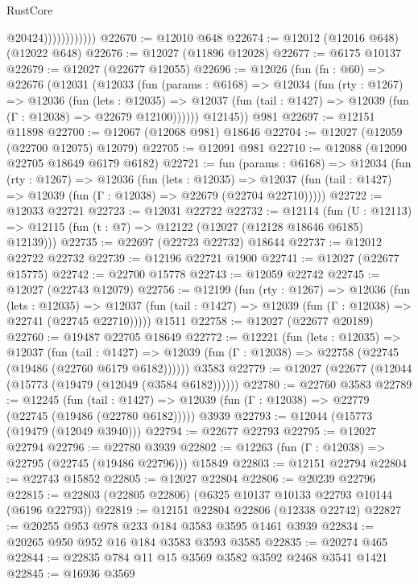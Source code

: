 \begin{lexlean}{RustCore}
\begin{coremodule}
                            @20424))))))))))))
@22670 := @12010 @648
@22674 := @12012 (@12016 @648) (@12022 @648)
@22676 := @12027 (@11896 @12028)
@22677 := @6175 @10137
@22679 := @12027 (@22677 @12055)
@22696 := @12026
    (fun (fn : @60) =>
    @22676
      (@12031
        (@12033
          (fun (params : @6168) =>
          @12034
            (fun (rty : @1267) =>
            @12036
              (fun (lets : @12035) =>
              @12037 (fun (tail : @1427) => @12039 (fun (Γ : @12038) => @22679 @12100))))))
        @12145))
    @981
@22697 := @12151 @11898
@22700 := @12067 (@12068 @981) @18646
@22704 := @12027 (@12059 (@22700 @12075) @12079)
@22705 := @12091 @981
@22710 := @12088 (@12090 @22705 @18649 @6179 @6182)
@22721 := fun (params : @6168) =>
  @12034
    (fun (rty : @1267) =>
    @12036
      (fun (lets : @12035) =>
      @12037 (fun (tail : @1427) => @12039 (fun (Γ : @12038) => @22679 (@22704 @22710)))))
@22722 := @12033 @22721
@22723 := @12031 @22722
@22732 := @12114
    (fun (U : @12113) => @12115 (fun (t : @7) => @12122 (@12027 (@12128 @18646 @6185) @12139)))
@22735 := @22697 (@22723 @22732) @18644
@22737 := @12012 @22722 @22732
@22739 := @12196 @22721 @1900
@22741 := @12027 (@22677 @15775)
@22742 := @22700 @15778
@22743 := @12059 @22742
@22745 := @12027 (@22743 @12079)
@22756 := @12199
    (fun (rty : @1267) =>
    @12036
      (fun (lets : @12035) =>
      @12037 (fun (tail : @1427) => @12039 (fun (Γ : @12038) => @22741 (@22745 @22710)))))
    @1511
@22758 := @12027 (@22677 @20189)
@22760 := @19487 @22705 @18649
@22772 := @12221
    (fun (lets : @12035) =>
    @12037
      (fun (tail : @1427) =>
      @12039 (fun (Γ : @12038) => @22758 (@22745 (@19486 (@22760 @6179 @6182))))))
    @3583
@22779 := @12027 (@22677 (@12044 (@15773 (@19479 (@12049 (@3584 @6182))))))
@22780 := @22760 @3583
@22789 := @12245
    (fun (tail : @1427) => @12039 (fun (Γ : @12038) => @22779 (@22745 (@19486 (@22780 @6182)))))
    @3939
@22793 := @12044 (@15773 (@19479 (@12049 @3940)))
@22794 := @22677 @22793
@22795 := @12027 @22794
@22796 := @22780 @3939
@22802 := @12263 (fun (Γ : @12038) => @22795 (@22745 (@19486 @22796))) @15849
@22803 := @12151 @22794
@22804 := @22743 @15852
@22805 := @12027 @22804
@22806 := @20239 @22796
@22815 := @22803 (@22805 @22806) (@6325 @10137 @10133 @22793 @10144 (@6196 @22793))
@22819 := @12151 @22804 @22806 (@12338 @22742)
@22827 := @20255 @953 @978 @233 @184 @3583 @3595 @1461 @3939
@22834 := @20265 @950 @952 @16 @184 @3583 @3593 @3585
@22835 := @20274 @465
@22844 := @22835 @784 @11 @15 @3569 @3582 @3592 @2468 @3541 @1421
@22845 := @16936 @3569

\end{coremodule}
\end{lexlean}
